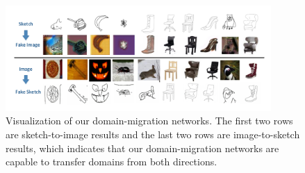 \documentclass[runningheads]{llncs}
\begin{document}
\begin{figure}[t]
\vspace{-2ex}
    \centering
    \includegraphics[width = 0.9\textwidth]{figures/gan_results.pdf}
    \vspace{-3ex}
    \caption{Visualization of our domain-migration networks. The first two rows are sketch-to-image results and the last two rows are image-to-sketch results, which indicates that our domain-migration networks are capable to transfer domains from both directions.}
    \label{fig:gan-figure}
\end{figure}
\end{document}
